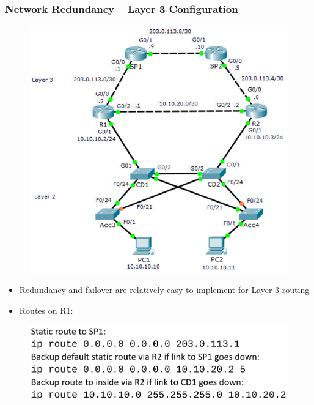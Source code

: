 \documentclass[pdflatex,compress,mathserif]{beamer}
\begin{document}
\begin{frame}
	\frametitle{Network Redundancy – Layer 3 Configuration}
	\begin{multicols}{2}
		\begin{figure}
			\centering
			\includegraphics[width=\linewidth]{img/img07}
		\end{figure}
		\columnbreak
		\begin{itemize}
			\item Redundancy and failover are relatively
easy to implement for Layer 3 routing
			\item Routes on R1:
		\end{itemize}
		\begin{figure}
			\centering
			\includegraphics[height=0.3\linewidth]{img/img08}
		\end{figure}
	\end{multicols}
\end{frame}
\end{document}
